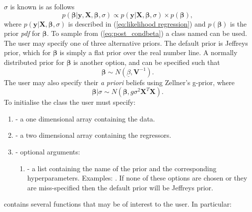 \documentclass[article]{jss}
\begin{document}
$\sigma$ is known is as follows
\begin{equation} 
p\left(\bm{\beta}|\bm{y},\bm{X},\bm{\beta},\sigma\right)\propto
  p(\bm{y}|\bm{X},\bm{\beta},\sigma)\times
  p(\bm{\beta}),\label{eq:post_condbeta}
\end{equation} where
$p(\bm{y}|\bm{X},\bm{\beta},\sigma)$ is described in
(\ref{eq:likelihood regression}) and $p(\bm{\beta})$ is the prior
\emph{pdf} for $\bm{\beta}.$ To sample from (\ref{eq:post_condbeta}) a
class named  can be used. The user may
specify one of three alternative priors.  The default prior is
Jeffreys prior, which for $\bm{\beta}$ is simply a flat prior over
the real number line. A normally distributed prior for $\bm{\beta}$ is
another option, and can be specified such that\[ \bm{\beta}\sim
N\left(\underline{\beta},\bm{V}^{-1}\right).\] The user may also
specify their \emph{a priori} beliefs using Zellner's g-prior, where\[
\bm{\beta}|\sigma\sim
N\left(\bm{\beta},g\sigma^{2}\bm{X}^{T}\bm{X}\right).\] To initialise
the class the user must specify:
\begin{enumerate}
\item {} - a one dimensional  array containing the data. 
\item {} - a two dimensional  array containing the regressors. 
\item {} - optional arguments:

\begin{enumerate}
\item {} - a list containing the name of the prior and the
  corresponding hyperparameters. Examples: . If none of
  these options are chosen or they are miss-specified then the default
  prior will be Jeffreys prior.
\end{enumerate}
\end{enumerate}
 contains several functions that may be of interest
to the user. In particular:
\end{document}
